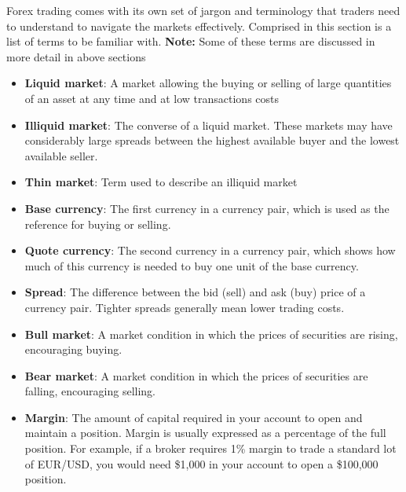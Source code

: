 \documentclass{report}
\begin{document}
     \pagebreak 

     \pagebreak 








     \pagebreak 
     \bigbreak \noindent 
     Forex trading comes with its own set of jargon and terminology that traders need to understand to navigate the markets effectively. Comprised in this section is a list of terms to be familiar with.
     \bigbreak \noindent 
     \textbf{Note:} Some of these terms are discussed in more detail in above sections
     \bigbreak \noindent 
     \begin{itemize}
         \item \textbf{Liquid market}: A market allowing the buying or selling of large quantities of an asset at any time and at low transactions costs
         \item \textbf{Illiquid market}: The converse of a liquid market. These markets may have considerably large spreads between the highest available buyer and the lowest available seller.
         \item \textbf{Thin market}: Term used to describe an illiquid market
         \item \textbf{Base currency}: The first currency in a currency pair, which is used as the reference for buying or selling.
         \item \textbf{Quote currency}: The second currency in a currency pair, which shows how much of this currency is needed to buy one unit of the base currency.
         \item \textbf{Spread}: The difference between the bid (sell) and ask (buy) price of a currency pair. Tighter spreads generally mean lower trading costs.
         \item \textbf{Bull market}: A market condition in which the prices of securities are rising, encouraging buying.
         \item \textbf{Bear market}: A market condition in which the prices of securities are falling, encouraging selling.
         \item \textbf{Margin}: The amount of capital required in your account to open and maintain a position. Margin is usually expressed as a percentage of the full position. For example, if a broker requires 1\% margin to trade a standard lot of EUR/USD, you would need \$1,000 in your account to open a \$100,000 position.

\end{itemize}
\end{document}
